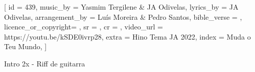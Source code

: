 [
    id                  = {439},
    music_by            = {Yasmim Tergilene & JA Odivelas}, %
    lyrics_by           = {JA Odivelas}, %
    arrangement_by      = {Luís Moreira & Pedro Santos}, %
    bible_verse         = {},
    licence_or_copyright= {},
    sr                  = {},
    cr                  = {},
    video_url           = {https://youtu.be/kSDE0ivrp28}, %
    extra               = {Hino Tema JA 2022},
    index               = {Muda o Teu Mundo},
]

\beginverse
Intro 2x - Riff de guitarra
\endverse

\beginverse

